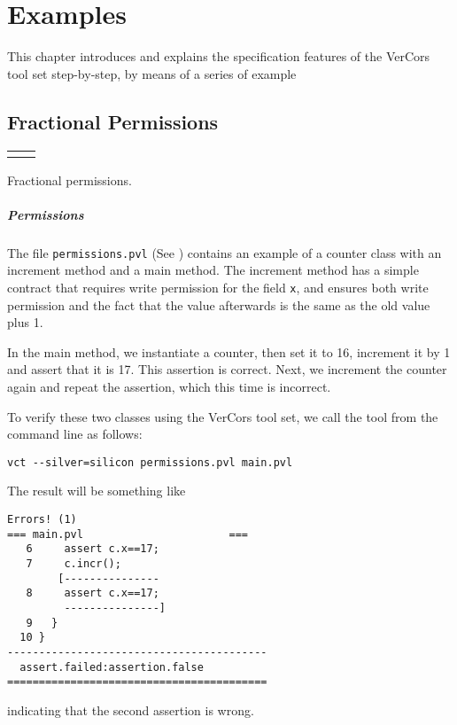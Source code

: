 
\chapter{Examples}

This chapter introduces and explains the specification features of the VerCors
tool set step-by-step, by means of a series of example

\section{Fractional Permissions}

\begin{listing}[b]
\begin{tabular}{l@{~~~~~}l}

&

\end{tabular}
\caption{Fractional permissions.}
\label{fractional permission}
\end{listing}

\paragraph{Permissions}
The file \verb+permissions.pvl+ (See ) contains an example of a counter class
with an increment method and a main method. The increment method has a simple contract that requires
write permission for the field \lstinline+x+, and ensures both write permission
and the fact that the value afterwards is the same as the old value plus 1.

In the main method, we instantiate a counter, then set it to 16, increment it by 1 and assert that it is 17.
This assertion is correct. Next, we increment the counter again and repeat the assertion, which this time
is incorrect.

To verify these two classes using the VerCors tool set, we call the
tool from the command line as follows:
\begin{verbatim}
vct --silver=silicon permissions.pvl main.pvl
\end{verbatim}
The result will be something like
\begin{verbatim}
Errors! (1)
=== main.pvl                       ===
   6     assert c.x==17;
   7     c.incr();
        [---------------
   8     assert c.x==17;
         ---------------]
   9   }
  10 }
-----------------------------------------
  assert.failed:assertion.false
=========================================
\end{verbatim}
indicating that the second assertion is wrong.

